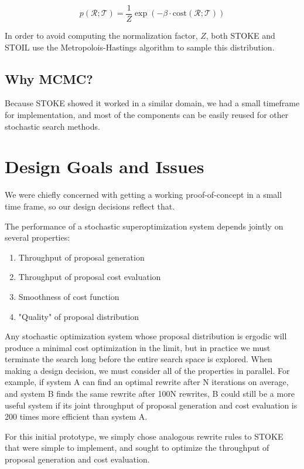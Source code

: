 \documentclass{article}
\newcommand{\R}{\mathcal{R}}
\newcommand{\T}{\mathcal{T}}
\newcommand{\cost}{\mbox{cost}}
\begin{document}
\begin{equation}
p(\R;\T)=\frac{1}{Z}\exp(-\beta\cdot\cost(\R;\T))
\end{equation}

In order to avoid computing the normalization factor, $Z$, both STOKE and STOIL use the Metropolois-Hastings algorithm to sample this distribution.



\subsection{Why MCMC?}
Because STOKE showed it worked in a similar domain,  we had a small timeframe for implementation, and most of the components can be easily reused for other stochastic search methods.


\section{Design Goals and Issues}

We were chiefly concerned with getting a working proof-of-concept in a small time frame, so our design decisions reflect that.

The performance of a stochastic superoptimization system depends jointly on several properties:

\begin{enumerate}
  \item Throughput of proposal generation
  \item Throughput of proposal cost evaluation
  \item Smoothness of cost function
  \item "Quality" of proposal distribution
\end{enumerate}

Any stochastic optimization system whose proposal distribution is ergodic will produce a minimal cost optimization in the limit, but in practice we must terminate the search long before the entire search space is explored. When making a design decision, we must consider all of the properties in parallel. For example, if system A can find an optimal rewrite after N iterations on average, and system B finds the same rewrite after 100N rewrites, B could still be a more useful system if its joint throughput of proposal generation and cost evaluation is 200 times more efficient than system A.

For this initial prototype, we simply chose analogous rewrite rules to STOKE that were simple to implement, and sought to optimize the throughput of proposal generation and cost evaluation.
\end{document}
